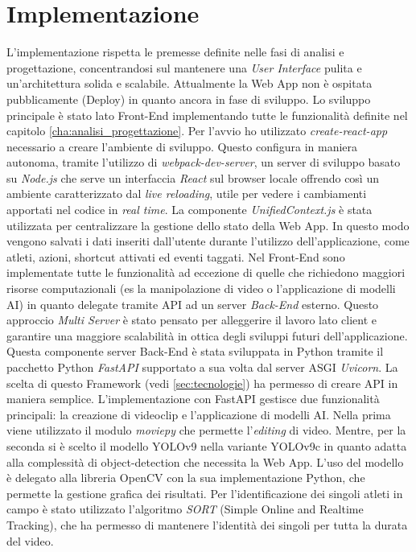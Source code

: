 \pagebreak

\section{Implementazione}
\label{sec:implementazione}

L'implementazione rispetta le premesse definite nelle fasi di analisi e progettazione, concentrandosi sul mantenere una \textit{User Interface} pulita e un'architettura solida e scalabile.
Attualmente la Web App non è ospitata pubblicamente (Deploy) in quanto ancora in fase di sviluppo.
Lo sviluppo principale è stato lato Front-End implementando tutte le funzionalità definite nel capitolo \ref{cha:analisi_progettazione}. Per l'avvio ho utilizzato \textit{create-react-app} necessario a creare l'ambiente di sviluppo. Questo configura in maniera autonoma, tramite l'utilizzo di  \textit{webpack-dev-server}, un server di sviluppo basato su \textit{Node.js} che serve un interfaccia \textit{React} sul browser locale offrendo così un ambiente caratterizzato dal \textit{live reloading}, utile per vedere i cambiamenti apportati nel codice in \textit{real time}. 
La componente \textit{UnifiedContext.js} è stata utilizzata per centralizzare la gestione dello stato della Web App. In questo modo vengono salvati i dati inseriti dall'utente durante l'utilizzo dell'applicazione, come atleti, azioni, shortcut attivati ed eventi taggati. 
Nel Front-End sono implementate tutte le funzionalità ad eccezione di quelle che richiedono maggiori risorse computazionali (es la manipolazione di video o l'applicazione di modelli AI) in quanto delegate tramite API ad un server \textit{Back-End} esterno.
Questo approccio \textit{Multi Server} è stato pensato per alleggerire il lavoro lato client e garantire una maggiore scalabilità in ottica degli sviluppi futuri dell'applicazione.
Questa componente server Back-End è stata sviluppata in Python tramite il pacchetto Python \textit{FastAPI} supportato a sua volta dal server ASGI \textit{Uvicorn}. La scelta di questo Framework (vedi \ref{sec:tecnologie}) ha permesso di creare API in maniera semplice.
L'implementazione con FastAPI gestisce due funzionalità principali: la creazione di videoclip e l'applicazione di modelli AI. Nella prima viene utilizzato il modulo \textit{moviepy} che permette l'\textit{editing} di video. Mentre, per la seconda si è scelto il modello YOLOv9 nella variante YOLOv9c in quanto adatta alla complessità di object-detection che necessita la Web App. L'uso del modello è delegato alla libreria OpenCV con la sua implementazione Python, che permette la gestione grafica dei risultati. Per l'identificazione dei singoli atleti in campo è stato utilizzato l'algoritmo \textit{SORT} (Simple Online and Realtime Tracking), che ha permesso di mantenere l'identità dei singoli per tutta la durata del video.  

